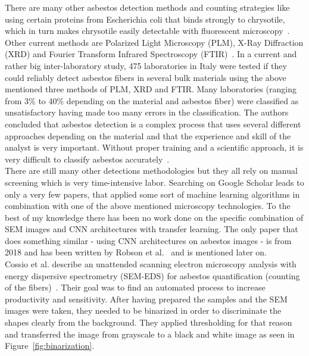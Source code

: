 \quad

There are many other asbestos detection methods and counting strategies like using certain proteins from Escherichia coli that binds strongly to chrysotile, which in turn makes chrysotile easily detectable with fluorescent microscopy~\cite{kuroda2008detection}. Other current methods are Polarized Light Microscopy (PLM), X-Ray Diffraction (XRD) and Fourier Transform Infrared Spectroscopy (FTIR)~\cite{campopiano2018inter}. In a current and rather big inter-laboratory study, 475 laboratories in Italy were tested if they could reliably detect asbestos fibers in several bulk materials using the above mentioned three methods of PLM, XRD and FTIR. Many laboratories (ranging from 3\% to 40\% depending on the material and asbestos fiber) were classified as unsatisfactory having made too many errors in the classification. The authors concluded that asbestos detection is a complex process that uses several different approaches depending on the material and that the experience and skill of the analyst is very important. Without proper training and a scientific approach, it is very difficult to classify asbestos accurately~\cite{campopiano2018inter}. \\

There are still many other detections methodologies but they all rely on manual screening which is very time-intensive labor. Searching on Google Scholar leads to only a very few papers, that applied some sort of machine learning algorithms in combination with one of the above mentioned microscopy technologies. To the best of my knowledge there has been no work done on the specific combination of SEM images and CNN architectures with transfer learning. The only paper that does something similar - using CNN architectures on asbestos images - is from 2018 and has been written by Robson et al.~\cite{robson2018fiac} and is mentioned later on. \\

Cossio et al. describe an unattended scanning electron microscopy analysis with energy dispersive spectrometry (SEM-EDS) for asbestos quantification (counting of the fibers)~\cite{cossio2018innovative}. Their goal was to find an automated process to increase productivity and sensitivity. After having prepared the samples and the SEM images were taken, they needed to be binarized in order to discriminate the shapes clearly from the background. They applied thresholding for that reason and transferred the image from grayscale to a black and white image as seen in Figure~\ref{fig:binarization}.

